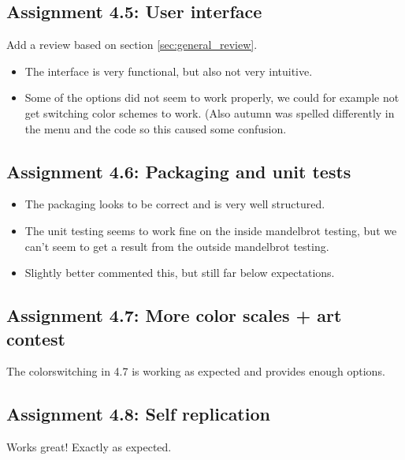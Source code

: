 \documentclass[a4paper]{article}
\begin{document}
\subsection*{Assignment 4.5: User interface}
Add a review based on section \ref{sec:general_review}.
\begin{itemize}
\item The interface is very functional, but also not very intuitive.
\item Some of the options did not seem to work properly, we could for example not get switching color schemes to work. (Also autumn was spelled differently in the menu and the code so this caused some confusion.
\end{itemize}

\subsection*{Assignment 4.6:  Packaging and unit tests}
\begin{itemize}
\item The packaging looks to be correct and is very well structured.
\item The unit testing seems to work fine on the inside mandelbrot testing, but we can't seem to get a result from the outside mandelbrot testing.
\item Slightly better commented this, but still far below expectations.
\end{itemize}

\subsection*{Assignment 4.7: More color scales + art contest}
The colorswitching in 4.7 is working as expected and provides enough options.

\subsection*{Assignment 4.8: Self replication}
Works great! Exactly as expected.




\end{document}
